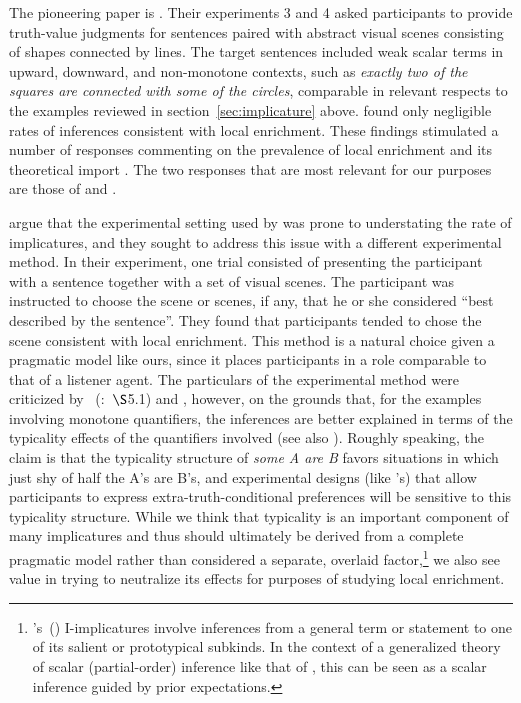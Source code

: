 \documentclass[leqno,12pt]{article}
\newcommand{\secref}[1]{section~\ref{#1}}
\newcommand{\posscitet}[1]{\citeauthor{#1}'s~(\citeyear{#1})}
\newcommand{\seccitet}[2]{\citeauthor{#1}~(\citeyear{#1}:~$\S$#2)}
\newcommand{\word}[1]{\emph{#1}}
\begin{document}
{The pioneering paper is \citealt{Geurts:Pouscoulous:2009}. Their
experiments 3 and 4 asked participants to provide truth-value
judgments for sentences paired with abstract visual scenes consisting
of shapes connected by lines. The target sentences included weak
scalar terms in upward, downward, and non-monotone contexts, such as
\word{exactly two of the squares are connected with some of the
  circles}, comparable in relevant respects to the examples reviewed
in \secref{sec:implicature} above.
\citeauthor{Geurts:Pouscoulous:2009} found only negligible rates of
inferences consistent with local enrichment. These findings stimulated
a number of responses commenting on the prevalence of local enrichment
and its theoretical import \citep{Ippolito:2010,Sauerland:2010}. The
two responses that are most relevant for our purposes are those of
\citet{Clifton:Dube:2010} and \citet{Chemla:Spector:2011}.

\citet{Clifton:Dube:2010} argue that the experimental setting used by
\citeauthor{Geurts:Pouscoulous:2009} was prone to understating the
rate of implicatures, and they sought to address this issue with a
different experimental method.  In their experiment, one trial
consisted of presenting the participant with a sentence together with
a set of visual scenes.  The participant was instructed to choose the
scene or scenes, if any, that he or she considered ``best described by
the sentence''.  They found that participants tended to chose the
scene consistent with local enrichment. This method is a natural
choice given a pragmatic model like ours, since it places participants
in a role comparable to that of a listener agent. The particulars of
the experimental method were criticized by
\seccitet{geurts-vantiel:2013:scalar}{5.1} and \citet{vanTiel:2014},
however, on the grounds that, for the examples involving monotone
quantifiers, the inferences are better explained in terms of the
typicality effects of the quantifiers involved (see also
\citealp{Degen:Tanenhaus:2014}).  Roughly speaking, the claim is that
the typicality structure of \word{some A are B} favors situations in
which just shy of half the A's are B's, and experimental designs (like
\citeauthor{Clifton:Dube:2010}'s) that allow participants to express
extra-truth-conditional preferences will be sensitive to this
typicality structure. While we think that typicality is an important
component of many implicatures and thus should ultimately be derived
from a complete pragmatic model rather than considered a separate,
overlaid factor,\footnote{\posscitet{Levinson00} I-implicatures
  involve inferences from a general term or statement to one of its
  salient or prototypical subkinds. In the context of a generalized
  theory of scalar (partial-order) inference like that of
  \citet{Hirschberg85}, this can be seen as a scalar inference guided
  by prior expectations.} we also see value in trying to neutralize
its effects for purposes of studying local enrichment.

}
\end{document}
